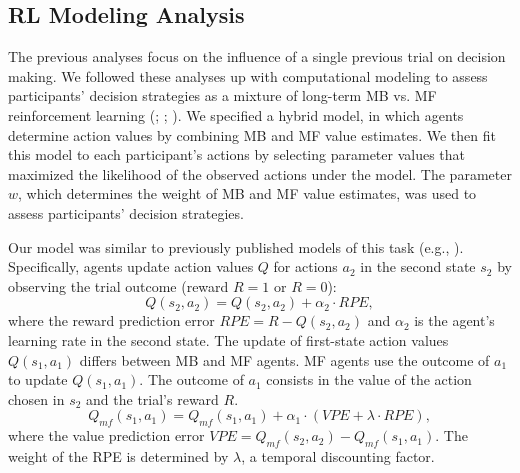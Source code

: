 \documentclass[11pt]{article} %
\begin{document}
\subsection{RL Modeling Analysis}
The previous analyses focus on the influence of a single previous trial on decision making. We followed these analyses up with computational modeling to assess participants' decision strategies as a mixture of long-term MB vs. MF reinforcement learning (\cite{akam_simple_2015}; \cite{daw_model-based_2011}; \cite{sutton_reinforcement_2017}). We specified a hybrid model, in which agents determine action values by combining MB and MF value estimates. We then fit this model to each participant's actions by selecting parameter values that maximized the likelihood of the observed actions under the model. The parameter $w$, which determines the weight of MB and MF value estimates, was used to assess participants' decision strategies.

Our model was similar to previously published models of this task (e.g., \cite{wunderlich_dopamine_2012}). Specifically, agents update action values $Q$ for actions $a_{2}$ in the second state $s_{2}$ by observing the trial outcome (reward $R = 1$ or $R = 0$):
%
\begin{equation}
Q(s_{2}, a_{2}) = Q(s_{2}, a_{2}) + \alpha_{2} \cdot RPE,
\end{equation}
%
where the reward prediction error $RPE = R - Q(s_{2}, a_{2})$ and $\alpha_{2}$ is the agent's learning rate in the second state. The update of first-state action values $Q(s_{1}, a_{1})$ differs between MB and MF agents. MF agents use the outcome of $a_{1}$ to update $Q(s_{1}, a_{1})$. The outcome of $a_{1}$ consists in the value of the action chosen in $s_{2}$ and the trial's reward $R$.
%
\begin{equation}
Q_{mf}(s_{1}, a_{1}) = Q_{mf}(s_{1}, a_{1}) + \alpha_{1} \cdot (VPE + \lambda \cdot RPE),
\end{equation}
%
where the value prediction error $VPE = Q_{mf}(s_{2}, a_{2}) - Q_{mf}(s_{1}, a_{1})$. The weight of the RPE is determined by $\lambda$, a temporal discounting factor.
\end{document}
